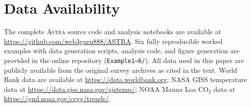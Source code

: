 \documentclass[usenatbib]{rasti}
\newcommand{\astra}{\textsc{Astra}\xspace}
\begin{document}
\section*{Data Availability}

The complete \astra source code and analysis notebooks are available at \url{https://github.com/web3guru888/ASTRA}.
Six fully reproducible worked examples with data generation scripts, analysis code, and figure generation are provided in the online repository (\texttt{Example1--6/}).
All data used in this paper are publicly available from the original survey archives as cited in the text.
World Bank data are available at \url{https://data.worldbank.org}; NASA GISS temperature data at \url{https://data.giss.nasa.gov/gistemp/}; NOAA Mauna Loa CO$_{2}$ data at \url{https://gml.noaa.gov/ccgg/trends/}.



\end{document}
